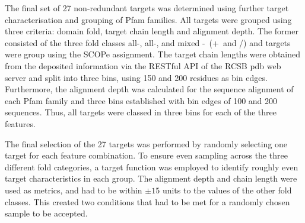 The final set of 27 non-redundant targets was determined using further target characterisation and grouping of Pfam families. All targets were grouped using three criteria: domain fold, target chain length and alignment depth. The former consisted of the three fold classes all-\textalpha, all-\textbeta, and mixed \textalpha-\textbeta\ (\textalpha+\textbeta\ and \textalpha/\textbeta) and targets were group using the SCOPe assignment. The target chain lengths were obtained from the deposited information via the RESTful API of the RCSB \gls{pdb} web server and split into three bins, using 150 and 200 residues as bin edges. Furthermore, the alignment depth was calculated for the sequence alignment of each Pfam family and three bins established with bin edges of 100 and 200 sequences. Thus, all targets were classed in three bins for each of the three features. 

The final selection of the 27 targets was performed by randomly selecting one target for each feature combination. To ensure even sampling across the three different fold categories, a target function was employed to identify roughly even target characteristics in each group. The alignment depth and chain length were used as metrics, and had to be within $\pm15$ units to the values of the other fold classes. This created two conditions that had to be met for a randomly chosen sample to be accepted.